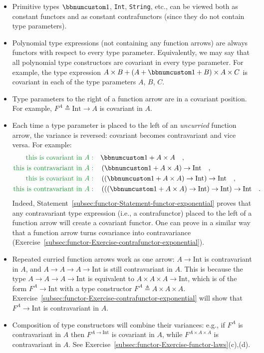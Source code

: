 \begin{itemize}
\item Primitive types $\bbnum 1$, \lstinline!Int!, \lstinline!String!,
etc., can be viewed both as constant functors and as constant contrafunctors
(since they do not contain type parameters).
\item Polynomial type expressions (not containing any function arrows) are
always functors with respect to every type
parameter. Equivalently, we may say that all polynomial type constructors
are covariant in every type parameter. For example, the type expression
$A\times B+\left(A+\bbnum 1+B\right)\times A\times C$ is covariant
in each of the type parameters $A$, $B$, $C$.
\item Type parameters to the right of a function arrow are in a covariant
position. For example, $F^{A}\triangleq\text{Int}\rightarrow A$ is
covariant in $A$.
\item Each time a type parameter is placed to the left of an \emph{uncurried}
function arrow, the variance is reversed: covariant becomes contravariant
and vice versa. For example:
\begin{align*}
{\color{greenunder}\text{this is covariant in }A:}\quad & \bbnum 1+A\times A\quad,\\
{\color{greenunder}\text{this is contravariant in }A:}\quad & \left(\bbnum 1+A\times A\right)\rightarrow\text{Int}\quad,\\
{\color{greenunder}\text{this is covariant in }A:}\quad & \left(\left(\bbnum 1+A\times A\right)\rightarrow\text{Int}\right)\rightarrow\text{Int}\quad,\\
{\color{greenunder}\text{this is contravariant in }A:}\quad & \left(\left(\left(\bbnum 1+A\times A\right)\rightarrow\text{Int}\right)\rightarrow\text{Int}\right)\rightarrow\text{Int}\quad.
\end{align*}
Indeed, Statement~\ref{subsec:functor-Statement-functor-exponential}
proves that any contravariant type expression (i.e., a contrafunctor)
placed to the left of a function arrow will create a covariant functor.
One can prove in a similar way that a function arrow turns covariance
into contravariance (Exercise~\ref{subsec:functor-Exercise-contrafunctor-exponential}).
\item Repeated curried function arrows work as one arrow: $A\rightarrow\text{Int}$
is contravariant in $A$, and $A\rightarrow A\rightarrow A\rightarrow\text{Int}$
is still contravariant in $A$. This is  because the type $A\rightarrow A\rightarrow A\rightarrow\text{Int}$
is equivalent to $A\times A\times A\rightarrow\text{Int}$, which
is of the form $F^{A}\rightarrow\text{Int}$ with a type constructor
$F^{A}\triangleq A\times A\times A$. Exercise~\ref{subsec:functor-Exercise-contrafunctor-exponential}
will show that $F^{A}\rightarrow\text{Int}$ is contravariant in $A$.
\item Composition of type constructors will combine their variances: e.g.,
if $F^{A}$ is contravariant in $A$ then $F^{A\rightarrow\text{Int}}$
is covariant in $A$, while $F^{A\times A\times A}$ is contravariant
in $A$. See Exercise~\ref{subsec:functor-Exercise-functor-laws}(c),(d).
\end{itemize}
